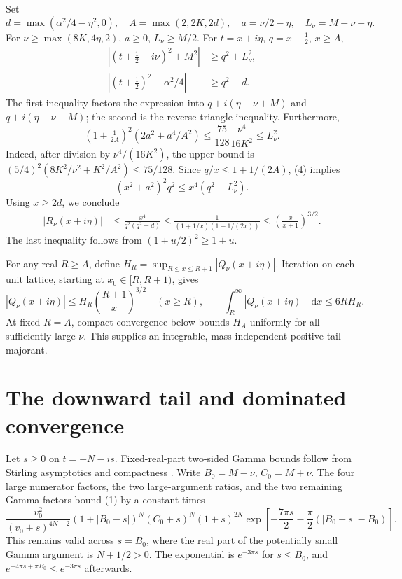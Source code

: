 \documentclass[11pt,a4paper]{article}
\newcommand{\dd}{\mathop{}\!\mathrm d}
\newcommand{\Q}{Q_\nu}
\begin{document}
Set
\[
 d=\max(\alpha^2/4-\eta^2,0),\quad A=\max(2,2K,2d),\quad
 a=\nu/2-\eta,\quad L_\nu=M-\nu+\eta .
\]
For \(\nu\ge\max(8K,4\eta,2)\), \(a\ge0\), \(L_\nu\ge M/2\).
For \(t=x+i\eta\), \(q=x+\tfrac12\), \(x\ge A\),
\begin{align*}
 |(t+\tfrac12-i\nu)^2+M^2|&\ge q^2+L_\nu^2,\\
 |(t+\tfrac12)^2-\alpha^2/4|&\ge q^2-d.
\end{align*}
The first inequality factors the expression into
\(q+i(\eta-\nu+M)\) and \(q+i(\eta-\nu-M)\);
the second is the reverse triangle inequality.
Furthermore,
\[
 (1+\tfrac1{2A})^2(2a^2+a^4/A^2)
 \le\frac{75}{128}\frac{\nu^4}{16K^2}
 \le L_\nu^2. \tag{4}
\]
Indeed, after division by \(\nu^4/(16K^2)\), the upper bound is
\((5/4)^2(8K^2/\nu^2+K^2/A^2)\le75/128\).
Since \(q/x\le1+1/(2A)\), (4) implies
\[
 (x^2+a^2)^2q^2\le x^4(q^2+L_\nu^2).
\]
Using \(x\ge2d\), we conclude
\begin{align}
 |R_\nu(x+i\eta)|
 &\le\frac{x^4}{q^2(q^2-d)}
 \le\frac1{(1+1/x)(1+1/(2x))}
 \le\left(\frac{x}{x+1}\right)^{3/2}. \tag{5}
\end{align}
The last inequality follows from \((1+u/2)^2\ge1+u\).

For any real \(R\ge A\), define
\(H_R=\sup_{R\le x\le R+1}|\Q(x+i\eta)|\).
Iteration on each unit lattice, starting at \(x_0\in[R,R+1)\), gives
\[
 |\Q(x+i\eta)|\le H_R\left(\frac{R+1}{x}\right)^{3/2}
 \quad(x\ge R),\qquad
 \int_R^\infty|\Q(x+i\eta)|\,\dd x\le6RH_R. \tag{6}
\]
At fixed \(R=A\), compact convergence below bounds \(H_A\)
uniformly for all sufficiently large \(\nu\). This supplies an
integrable, mass-independent positive-tail majorant.

\newpage
\section{The downward tail and dominated convergence}
Let \(s\ge0\) on \(t=-N-is\). Fixed-real-part two-sided Gamma
bounds follow from Stirling asymptotics and compactness
\cite{stirling}. Write \(B_0=M-\nu\), \(C_0=M+\nu\).
The four large numerator factors, the two large-argument ratios,
and the two remaining Gamma factors bound (1) by a constant times
\[
 \frac{v_0^2}{(v_0+s)^{4N+2}}
 (1+|B_0-s|)^N(C_0+s)^N(1+s)^{2N}
 \exp\!\left[-\frac{7\pi s}{2}
 -\frac{\pi}{2}(|B_0-s|-B_0)\right]. \tag{7}
\]
This remains valid across \(s=B_0\), where the real part of the
potentially small Gamma argument is \(N+1/2>0\).
The exponential is \(e^{-3\pi s}\) for \(s\le B_0\), and
\(e^{-4\pi s+\pi B_0}\le e^{-3\pi s}\) afterwards.
\end{document}
